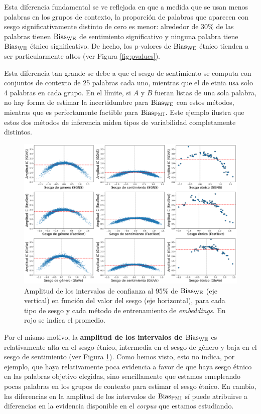 Esta diferencia fundamental se ve reflejada en que a medida que se usan menos palabras en los grupos de contexto, la proporción de palabras que aparecen con sesgo significativamente distinto de cero es menor: alrededor de 30\% de las palabras tienen $\operatorname{Bias_{WE}}$ de sentimiento significativo y ninguna palabra tiene $\operatorname{Bias_{WE}}$ étnico significativo. De hecho, los p-valores de $\operatorname{Bias_{WE}}$ étnico tienden a ser particularmente altos (ver Figura \ref{fig:pvalues}).  

Esta diferencia tan grande se debe a que el sesgo de sentimiento se computa con conjuntos de contexto de 25 palabras cada uno, mientras que el de etnia usa solo 4 palabras en cada grupo. En el límite, si $A$ y $B$ fueran listas de una sola palabra, no hay forma de estimar la incertidumbre para $\operatorname{Bias_{WE}}$ con estos métodos, mientras que es perfectamente factible para $\operatorname{Bias_{PMI}}$. Este ejemplo ilustra que estos dos métodos de inferencia miden tipos de variabilidad completamente distintos.

\begin{figure}[h]
    \centering
    \includegraphics[width=\textwidth]{img/grid_ics.png}
    \caption{
        Amplitud de los intervalos de confianza al 95\% de $\operatorname{Bias_{WE}}$ (eje vertical) en función del valor del sesgo (eje horizontal), para cada tipo de sesgo y cada método de entrenamiento de \emph{embeddings}. En rojo se indica el promedio.
        }
    \label{fig:grid_ics_bias_we}
\end{figure}

Por el mismo motivo, la \textbf{amplitud de los intervalos de $\operatorname{Bias_{WE}}$} es relativamente alta en el sesgo étnico, intermedia en el sesgo de género y baja en el sesgo de sentimiento (ver Figura \ref{fig:grid_ics_bias_we}). Como hemos visto, esto no indica, por ejemplo, que haya relativamente poca evidencia a favor de que haya sesgo étnico en las palabras objetivo elegidas, sino sencillamente que estamos emepleando pocas palabras en los grupos de contexto para estimar el sesgo étnico. En cambio, las diferencias en la amplitud de los intervalos de $\operatorname{Bias_{PMI}}$ sí puede atribuirse a diferencias en la evidencia disponible en el \emph{corpus} que estamos estudiando.

